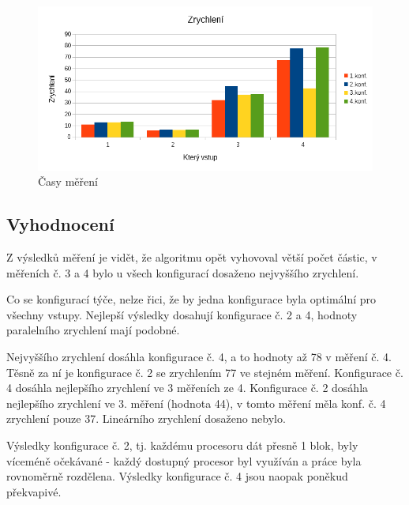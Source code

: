 \documentclass[12pt]{article}
\begin{document}
\begin{figure}[H]
  \begin{center}
      \includegraphics[width=14cm]{images/cuda/zrychleni.png}
    \caption{Časy měření}
  \end{center}
\end{figure}

\subsection{Vyhodnocení}
Z výsledků měření je vidět, že algoritmu opět vyhovoval větší počet částic, v měřeních č. 3 a 4 bylo u všech konfigurací dosaženo nejvyššího zrychlení.

Co se konfigurací týče, nelze řici, že by jedna konfigurace byla optimální pro všechny vstupy.
Nejlepší výsledky dosahují konfigurace č. 2 a 4, hodnoty paralelního zrychlení mají podobné.

Nejvyššího zrychlení dosáhla konfigurace č. 4, a to hodnoty až 78 v měření č. 4. Těsně za ní je konfigurace č. 2 se zrychlením 77 ve stejném měření.
Konfigurace č. 4 dosáhla nejlepšího zrychlení ve 3 měřeních ze 4.
Konfigurace č. 2 dosáhla nejlepšího zrychlení ve 3. měření (hodnota 44), v tomto měření měla konf. č. 4 zrychlení pouze 37.
Lineárního zrychlení dosaženo nebylo.

Výsledky konfigurace č. 2, tj. každému procesoru dát přesně 1 blok, byly víceméně očekávané - každý dostupný procesor byl využíván a práce byla rovnoměrně rozdělena.
Výsledky konfigurace č. 4 jsou naopak poněkud překvapivé.
\end{document}
